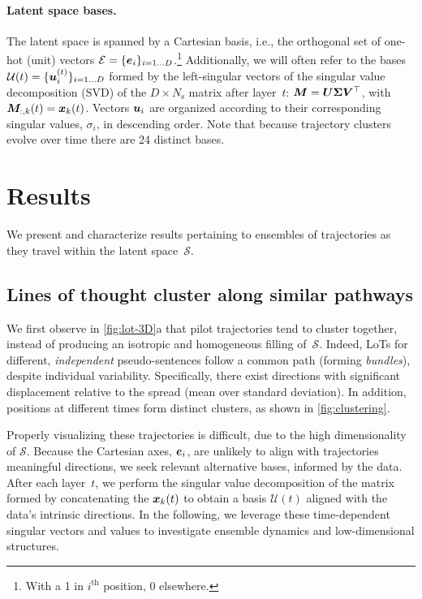 \documentclass{article} %
\newcommand{\cje}[1]{{\color{red} CJE: #1}} %
\begin{document}
\paragraph{Latent space bases.}
The latent space is spanned by a Cartesian basis, i.e., the orthogonal set of one-hot (unit) vectors $\mathcal{E} = \{ {\bm{e}}_i \}_{i = 1 \dots D}$.\footnote{With a 1 in $i^\mathrm{th}$ position, 0 elsewhere.}
Additionally, we will often refer to the bases $\mathcal{U}(t) = \{ {\bm{u}}_i^{(t)} \}_{i = 1 \dots D}$ formed by the left-singular vectors of the singular value decomposition (SVD) of the $D\times N_\mathrm{s}$ matrix after layer~$t$: ${\bm{M}}  = {\bm{U}} \mathbf{\Sigma} {\bm{V}}^{\top}$, with 
${\bm{M}}_{:, k}(t) = {\bm{x}}_k(t)$.
Vectors ${\bm{u}}_i$ are organized according to their corresponding singular values, $\sigma_i$, in descending order.
Note that because trajectory clusters evolve over time there are 24 distinct bases. 

\section{Results}
\label{sec:results}

We present and characterize results pertaining to ensembles of trajectories as they travel within the latent space~$\mathcal{S}$.

\subsection{Lines of thought cluster along similar pathways}

We first observe in \cref{fig:lot-3D}a that pilot trajectories tend to cluster together, instead of producing an isotropic and homogeneous filling of~$\mathcal{S}$.
Indeed, LoTs for different, \emph{independent} pseudo-sentences follow a common path (forming \emph{bundles}), despite individual variability. 
Specifically, there exist directions with significant displacement relative to the spread (mean over standard deviation).
In addition, positions at different times form distinct clusters, as shown in \cref{fig:clustering}. 

Properly visualizing these trajectories is difficult, due to the high dimensionality of $\mathcal{S}$.
Because the Cartesian axes, ${\bm{e}}_i$, are unlikely to align with trajectories meaningful directions, we seek relevant alternative bases, informed by the data.
After each layer~$t$, we perform the singular value decomposition of the matrix formed by concatenating the ${\bm{x}}_k(t)$ to obtain a basis $\mathcal{U}(t)$ aligned with the data's intrinsic directions. 
In the following, we leverage these time-dependent singular vectors and values to investigate ensemble dynamics and low-dimensional structures.
\end{document}
